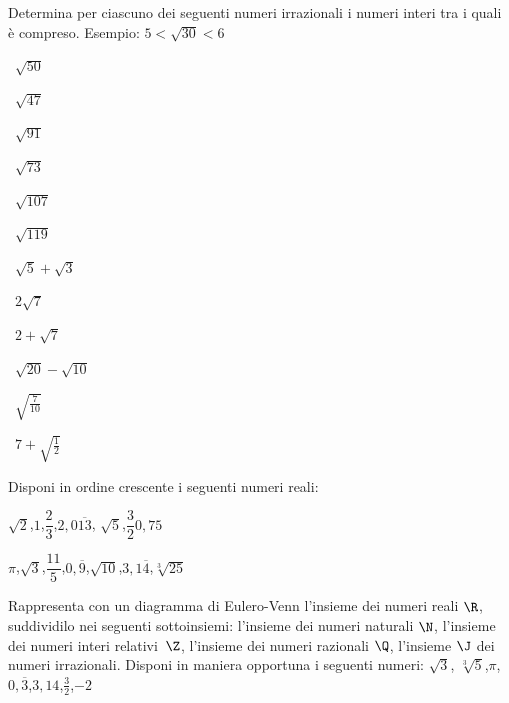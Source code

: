 \begin{esercizio}
\label{ese:1.4}
 Determina per ciascuno dei seguenti numeri irrazionali i numeri interi tra 
i quali è compreso. Esempio: \(5<\sqrt{30}<6\)
\begin{multicols}{4}
\begin{enumeratea}
 \item~\(\sqrt{50}\)
 \item~\(\sqrt{47}\)
 \item~\(\sqrt{91}\)
 \item~\(\sqrt{73}\)
 \item~\(\sqrt{107}\)
 \item~\(\sqrt{119}\)
 \item~\(\sqrt 5+\sqrt 3\)
 \item~\(2\sqrt 7\)
 \item~\(2+\sqrt 7\)
 \item~\(\sqrt{20}-\sqrt{10}\)
 \item~\(\sqrt{\frac 7{10}}\)
 \item~\(7+\sqrt{\frac 1 2}\)
\end{enumeratea}
\end{multicols}
\end{esercizio}

\begin{esercizio}
\label{ese:1.5}
 Disponi in ordine crescente i seguenti numeri reali:
 \begin{enumeratea}
 \item \(\sqrt 2\),\quad \(1\),\quad \(\dfrac 2 3\),\quad \(2,0\overline{13}\),\quad 
\(\sqrt 5\),\quad \(\dfrac 3 2\)\quad \(0,75\)
 \item \(\pi\),\quad \(\sqrt 3\),\quad \(\dfrac{11} 5\),\quad \(0,\overline 
9\),\quad \(\sqrt{10}\),\quad \(3,1\overline 4\),\quad \(\sqrt[3]{25}\)
 \end{enumeratea}
\end{esercizio}

\begin{esercizio}
\label{ese:1.6}
 Rappresenta con un diagramma di Eulero-Venn l'insieme dei numeri reali 
\(\R\), suddividilo nei seguenti sottoinsiemi: l'insieme dei numeri 
naturali \(\N\), l'insieme dei numeri interi relativi~\(\Z\), l'insieme 
dei numeri razionali \(\Q\), l'insieme \(\J\) dei numeri irrazionali. 
Disponi in maniera opportuna i seguenti numeri: \(\sqrt 3\),\quad 
\(\sqrt[3]5\),\quad\(\pi\),\quad \(0,\overline 3\),\quad \(3,14\),\quad \(\frac 3 
2\),\quad\(-2\)
\end{esercizio}

